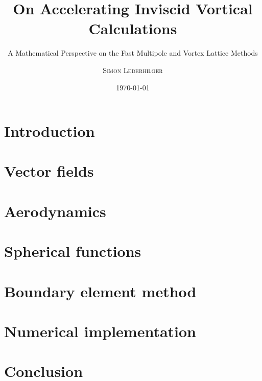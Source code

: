 \documentclass{article}
\title{On Accelerating Inviscid Vortical Calculations}
\subtitle{A Mathematical Perspective on the Fast Multipole and Vortex Lattice Methods}
\author{\textsc{Simon Lederhilger}}
\date{\today}
\begin{document}
\maketitle\thispagestyle{empty}

%

\newpage
\thispagestyle{fancy}
\tableofcontents

\newpage
\printunsrtglossary[type=symbols,style=topicmcols]
%

\newpage
{}
\section{Introduction}


\newpage
\section{Vector fields}


\section{Aerodynamics}


\section{Spherical functions}


\section[Boundary element method]{Boundary element method}


\section{Numerical implementation}


\section{Conclusion}


\printbibliography

\newpage

\end{document}
